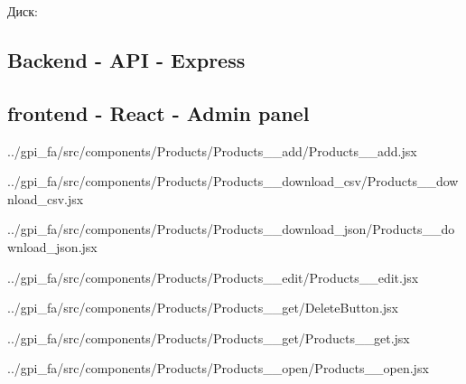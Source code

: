 \documentclass[12pt, a4paper, simple]{eskdtext}
\begin{document}
    
    Диск:
    \newpage
    
    \subsection*{Backend - API - Express}
    
    
    
    
    
    
    
    
    
    
    
    \hspace{0pt}

    \subsection*{frontend - React - Admin panel}
    
    
    
    
    
    
    
    
    
    
    
    
        {../gpi_fa/src/components/Products/Products__add/Products__add.jsx}
    
        {../gpi_fa/src/components/Products/Products__download_csv/Products__download_csv.jsx}
    
        {../gpi_fa/src/components/Products/Products__download_json/Products__download_json.jsx}
    
        {../gpi_fa/src/components/Products/Products__edit/Products__edit.jsx}
    
        {../gpi_fa/src/components/Products/Products__get/DeleteButton.jsx}
    
        {../gpi_fa/src/components/Products/Products__get/Products__get.jsx}
    
        {../gpi_fa/src/components/Products/Products__open/Products__open.jsx}
\end{document}
